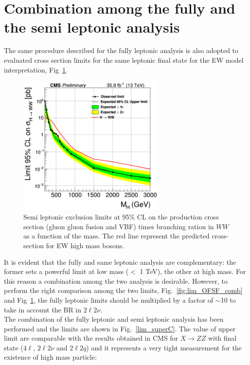 \section{Combination among the fully and the semi leptonic analysis}
The same procedure described for the fully leptonic analysis is also adopted to evaluated cross section limits  for the same leptonic final state
for the EW model interpretation, Fig~\ref{limit_observed_lnuqq_VBF0_log-1}.
\begin{figure}[htb]
\centering
\includegraphics[width=0.65\textwidth]{../Cap6/lnuqq}
\caption{Semi leptonic exclusion limits at 95$\%$ CL  on the production cross section (gluon gluon fusion and VBF) times branching ration in $WW$ as a function of the mass.  The red line represent the predicted cross-section for EW high mass bosons.}
\label{limit_observed_lnuqq_VBF0_log-1}
\end{figure}
It is evident that the fully and same leptonic analysis are complementary: 
the former sets a powerful limit at low mass ($<$ 1 TeV), the other at  high mass. For this reason a combination among the two analysis is desirable.
However, to perform the right comparison among the two limits,  Fig.~\ref{fig:lim_OFSF_comb} and  Fig~\ref{limit_observed_lnuqq_VBF0_log-1}, the 
fully leptonic limits should be multiplied by a factor of $\sim$10 to take in account the BR in $ 2\ell 2\nu$.\\
\newline
The  combination of the fully leptonic and semi leptonic analysis has been performed and the limits are shown in Fig.~\ref{lim_superC}. 
The value of upper limit are comparable with the results obtained in CMS for $X \to ZZ$ with final state ($4\ell$, $2\ell 2\nu$ and $2\ell 2q$) \cite{Sirunyan:2018qlb} and it represents a very tight measurement  for the existence of  high mass particle: 
